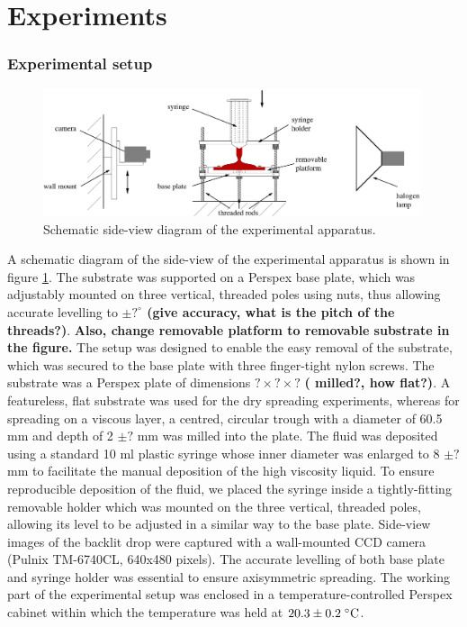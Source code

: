 \documentclass[aip,graphicx]{revtex4-1}
\begin{document}
\section{Experiments}
\label{sec:experiments}

\subsubsection{Experimental setup}
\label{setup}

\begin{figure}[!h]
\centering
\includegraphics[width=0.99\textwidth]{figures/experimental_apparatus.eps}
\caption{Schematic side-view diagram of the experimental apparatus.}
\label{fig:experimental_apparatus}
\end{figure}

A schematic diagram of the side-view of the experimental apparatus is
shown in figure \ref{fig:experimental_apparatus}.  The substrate was
supported on a Perspex base plate, which was adjustably mounted on
three vertical, threaded poles using nuts, thus allowing accurate
levelling to {\bf $\pm ?^\circ$ (give accuracy, what is the pitch of
  the threads?)}. {\bf Also, change removable platform to removable
  substrate in the figure.} The setup was designed to enable the easy
removal of the substrate, which was secured to the base plate with
three finger-tight nylon screws. The substrate was a Perspex plate of
dimensions {\bf $? \times ? \times ?$} {\bf( milled?, how flat?)}. A
featureless, flat substrate was used for the dry spreading
experiments, whereas for spreading on a viscous layer, a centred,
circular trough with a diameter of 60.5 mm and depth of 2 {\bf $\pm
  ?$} mm was milled into the plate.  The fluid was deposited using a
standard 10 ml plastic syringe whose inner diameter was enlarged 
to 8 {\bf $\pm ?$} mm to facilitate the manual deposition of the high
viscosity liquid. To ensure reproducible deposition of the
fluid, we placed the syringe inside a tightly-fitting removable
holder which was mounted on the three vertical, threaded poles, 
allowing its level to be adjusted in a similar way to the base plate.  
Side-view images of the backlit drop were captured with a wall-mounted 
CCD camera (Pulnix TM-6740CL, 640x480 pixels). The
accurate levelling of both base plate and syringe holder was essential
to ensure axisymmetric spreading. The working part of the experimental setup was
enclosed in a temperature-controlled Perspex cabinet within which the 
temperature was held at $20.3 \pm 0.2 \; ^{\circ} \text{C}$.
\end{document}
